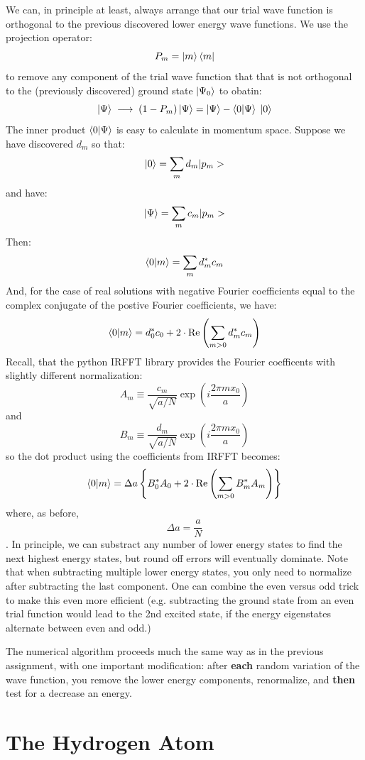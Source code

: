 \documentclass[12pt]{article}
\begin{document}
We can, in principle at least, always arrange that our trial wave function is orthogonal to the previous discovered lower energy wave functions.  We use the projection operator:
$$P_m = \ket{m}\bra{m}$$
to remove any component of the trial wave function that that is not orthogonal to the (previously discovered) ground state $\ket{\Psi_0}$ to obatin:
$$\ket{\Psi} \; \longrightarrow \; (1-P_m) \ket{\Psi} =
\ket{\Psi} - \braket{0|\Psi} \; \ket{0}$$
The inner product $\braket{0|\Psi}$ is easy to calculate in momentum space.  Suppose we have discovered $d_m$ so that:
$$\ket{0} = \sum_m d_m |p_m>$$
and have:
$$\ket{\Psi} = \sum_m c_m |p_m>$$
Then:
$$\braket{0|m} = \sum_m d_m^* c_m$$
And, for the case of real solutions with negative Fourier coefficients equal to the complex conjugate of the postive Fourier coefficients, we have:
$$\braket{0|m} = d_0^* c_0 + 2 \cdot {\rm Re} \left( \sum_{m>0} d_m^* c_m \right) $$
Recall, that the python IRFFT library provides the Fourier coefficents with slightly different normalization:
\begin{equation}
A_m \equiv \frac{c_m}{\sqrt{a/N}} \exp\left(i \frac{2\pi m x_0}{a}\right)
\end{equation}
and
\begin{equation}
B_m \equiv \frac{d_m}{\sqrt{a/N}} \exp\left(i \frac{2\pi m x_0}{a}\right)
\end{equation}
so the dot product using the coefficients from IRFFT becomes:
$$\braket{0|m} = \Delta a \left\{ B_0^* A_0 + 2 \cdot {\rm Re} \left( \sum_{m>0} B_m^* A_m \right) \right\}$$
where, as before,
$$\Delta a = \frac{a}{N}$$.
In principle, we can substract any number of lower energy states to
find the next highest energy states, but round off errors will
eventually dominate.  Note that when subtracting multiple lower energy
states, you only need to normalize after subtracting the last
component.  One can combine the even versus odd trick to make this even more
efficient (e.g. subtracting the ground state from an even trial
function would lead to the 2nd excited state, if the energy
eigenstates alternate between even and odd.)

The numerical algorithm proceeds much the same way as in the previous
assignment, with one important modification: after {\bf each} random
variation of the wave function, you remove the lower energy
components, renormalize, and {\bf then} test for a decrease an energy.

\section{The Hydrogen Atom}
\end{document}
